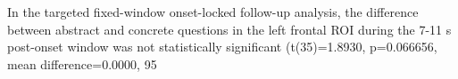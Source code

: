 In the targeted fixed-window onset-locked follow-up analysis, the difference between abstract and concrete questions in the left frontal ROI during the 7-11 s post-onset window was not statistically significant (t(35)=1.8930, p=0.066656, mean difference=0.0000, 95%
